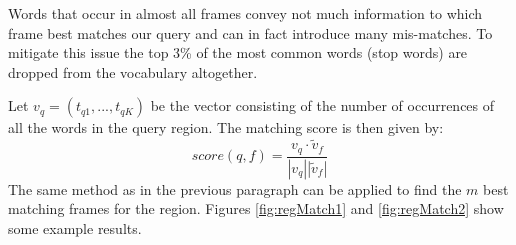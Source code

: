 \documentclass{paper}
\begin{document}
Words that occur in almost all frames convey not much information to which frame best matches our query and can in fact introduce many mis-matches. To mitigate this issue the top 3\% of the most common words (stop words) are dropped from the vocabulary altogether. 

Let $v_q=(t_{q1},...,t_{qK})$ be the vector consisting of the number of occurrences of all the words in the query region. The matching score is then given by:
\begin{equation}
score(q,f)= \frac{v_q\cdot \tilde{v}_f}{|v_q| | \tilde{v}_f|}
\end{equation}
The same method as in the previous paragraph can be applied to find the $m$ best matching frames for the region. Figures \ref{fig:regMatch1} and \ref{fig:regMatch2} show some example results. 
\end{document}
